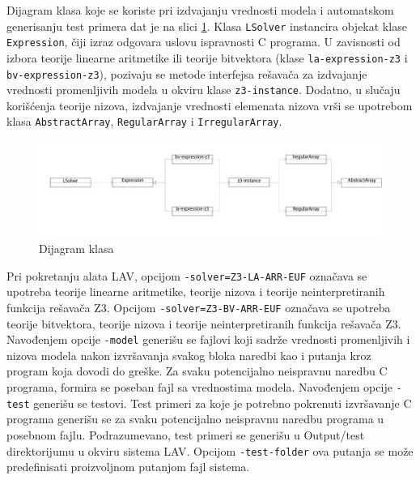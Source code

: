 \documentclass[12pt,oneside]{memoir}
\begin{document}
\par
Dijagram klasa koje se koriste pri izdvajanju vrednosti modela i automatskom generisanju test primera dat je na slici \ref{fig:dijagram}. Klasa \texttt{LSolver} instancira objekat klase \texttt{Expression}, čiji izraz odgovara uslovu ispravnosti C programa. U zavisnosti od izbora teorije linearne aritmetike ili teorije bitvektora (klase \texttt{la-expression-z3} i \texttt{bv-expression-z3}), pozivaju se metode interfejsa rešavača za izdvajanje vrednosti promenljivih modela u okviru klase \texttt{z3-instance}. Dodatno, u slučaju korišćenja teorije nizova, izdvajanje vrednosti elemenata nizova vrši se upotrebom klasa \texttt{AbstractArray}, \texttt{RegularArray} i \texttt{IrregularArray}.
\begin{figure}[!ht]
\hspace{-1.5cm}
  \includegraphics[width=1.2\textwidth]{dijagram.png}
  \caption{Dijagram klasa}
  \label{fig:dijagram}
\end{figure}

\par

Pri pokretanju alata LAV, opcijom \texttt{-solver=Z3-LA-ARR-EUF} označava se upotreba teorije linearne aritmetike, teorije nizova i teorije neinterpretiranih funkcija rešavača Z3. Opcijom \texttt{-solver=Z3-BV-ARR-EUF} označava se upotreba teorije bitvektora, teorije nizova i teorije neinterpretiranih funkcija rešavača Z3. Navođenjem opcije \texttt{-model} generišu se fajlovi koji sadrže vrednosti promenljivih i nizova modela nakon izvršavanja svakog bloka naredbi kao i putanja kroz program koja dovodi do greške. Za svaku potencijalno neispravnu naredbu C programa, formira se poseban fajl sa vrednostima modela. Navođenjem opcije \texttt{-test} generišu se testovi. Test primeri za koje je potrebno pokrenuti izvršavanje C programa generišu se za svaku potencijalno neispravnu naredbu programa u posebnom fajlu. Podrazumevano, test primeri se generišu u Output/test direktorijumu u okviru sistema LAV. Opcijom \texttt{-test-folder} ova putanja se može predefinisati proizvoljnom putanjom fajl sistema.

\par
\end{document}
